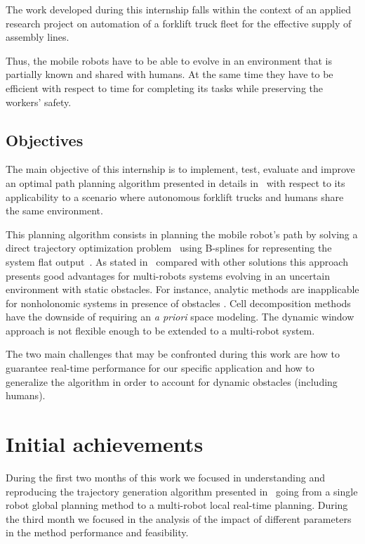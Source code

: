 The work developed during this internship falls within the context of an applied research project on automation of a forklift truck fleet for the effective supply of assembly lines.

Thus, the mobile robots have to be able to evolve in an environment that is partially known and shared with humans. At the same time they have to be efficient with respect to time for completing its tasks while preserving the workers' safety.

\subsection{Objectives}

The main objective of this internship is to implement, test, evaluate and improve an optimal path planning algorithm presented in details in~\cite{Defoort2007a} with respect to its applicability to a scenario where autonomous forklift trucks and humans share the same environment.

This planning algorithm consists in planning the mobile robot's path by solving a direct trajectory optimization problem~\cite{betts1998survey} using B-splines for representing the system flat output~\cite{milam2003real}. As stated in~\cite{Defoort2007a} compared with other solutions this approach presents good advantages for multi-robots systems evolving in an uncertain environment with static obstacles. For instance, analytic methods  are inapplicable for nonholonomic systems in presence of obstacles \cite{schwartz1988survey}. Cell decomposition methods \cite{latombe2012robot} have the downside of requiring an \textit{a priori} space modeling. The dynamic window approach \cite{fox1997dynamic} is not flexible enough to be extended to a multi-robot system.

The two main challenges that may be confronted during this work are how to guarantee real-time performance for our specific application and how to generalize the algorithm in order to account for dynamic obstacles (including humans).

\clearpage
\section{Initial achievements}
\label{sec:etatdelart}


During the first two months of this work we focused in understanding and reproducing the trajectory generation algorithm presented in~\cite{Defoort2007a} going from a single robot global planning method to a multi-robot local real-time planning. During the third month we focused in the analysis of the impact of different parameters in the method performance and feasibility.

